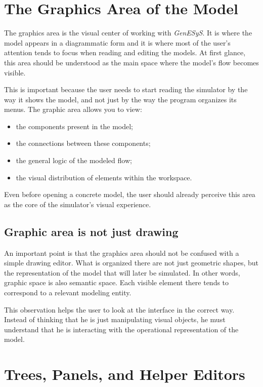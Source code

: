 \section{The Graphics Area of the Model}
\label{sec:cap3_area_grafica_modelo}

The graphics area is the visual center of working with \textit{GenESyS}. It is where the model appears in a diagrammatic form and it is where most of the user's attention tends to focus when reading and editing the models. At first glance, this area should be understood as the main space where the model's flow becomes visible.

This is important because the user needs to start reading the simulator by the way it shows the model, and not just by the way the program organizes its menus. The graphic area allows you to view:
\begin{itemize}
\item the components present in the model;
\item the connections between these components;
\item the general logic of the modeled flow;
\item the visual distribution of elements within the workspace.
\end{itemize}

Even before opening a concrete model, the user should already perceive this area as the core of the simulator's visual experience.

\subsection{Graphic area is not just drawing}
\label{subsec:cap3_area_grafica_nao_apenas_desenho}

An important point is that the graphics area should not be confused with a simple drawing editor. What is organized there are not just geometric shapes, but the representation of the model that will later be simulated. In other words, graphic space is also semantic space. Each visible element there tends to correspond to a relevant modeling entity.

This observation helps the user to look at the interface in the correct way. Instead of thinking that he is just manipulating visual objects, he must understand that he is interacting with the operational representation of the model.

\section{Trees, Panels, and Helper Editors}
\label{sec:cap3_arvores_paineis_editores}

